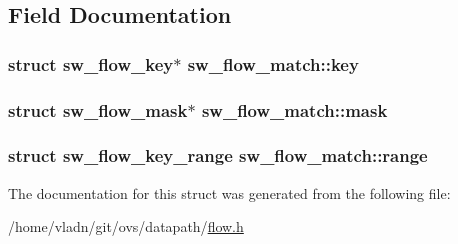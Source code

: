 \subsection{Field Documentation}
\hypertarget{structsw__flow__match_a4030aac38105b63798ea11f43f506372}{}
\subsubsection[{key}]{\setlength{\rightskip}{0pt plus 5cm}struct {\bf sw\+\_\+flow\+\_\+key}$\ast$ sw\+\_\+flow\+\_\+match\+::key}\label{structsw__flow__match_a4030aac38105b63798ea11f43f506372}
\hypertarget{structsw__flow__match_a4536aff731528d6def7d386435c203d1}{}
\subsubsection[{mask}]{\setlength{\rightskip}{0pt plus 5cm}struct {\bf sw\+\_\+flow\+\_\+mask}$\ast$ sw\+\_\+flow\+\_\+match\+::mask}\label{structsw__flow__match_a4536aff731528d6def7d386435c203d1}
\hypertarget{structsw__flow__match_aed5e18f9a96464cce4b4e4443d550b2d}{}
\subsubsection[{range}]{\setlength{\rightskip}{0pt plus 5cm}struct {\bf sw\+\_\+flow\+\_\+key\+\_\+range} sw\+\_\+flow\+\_\+match\+::range}\label{structsw__flow__match_aed5e18f9a96464cce4b4e4443d550b2d}


The documentation for this struct was generated from the following file\+:\begin{DoxyCompactItemize}
\item 
/home/vladn/git/ovs/datapath/\hyperlink{flow_8h}{flow.\+h}\end{DoxyCompactItemize}
